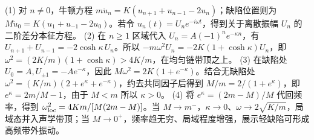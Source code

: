 (1) 对 \(n\ne0\)，牛顿方程 \(m\ddot u_n=K(u_{n+1}+u_{n-1}-2u_n)\)；缺陷位置则为 \(M\ddot u_0=K(u_1+u_{-1}-2u_0)\)。若令 \(u_n(t)=U_ne^{-i\omega t}\)，得到关于离散振幅 \(U_n\) 的二阶差分本征方程。
(2) 在 \(n\ge1\) 区域代入 \(U_n=A(-1)^n e^{-\kappa n}\)，有 \(U_{n+1}+U_{n-1}=-2\cosh\kappa\,U_n\)。所以 \(-m\omega^2U_n=-2K(1+\cosh\kappa)U_n\)，即 \(\omega^2=(2K/m)(1+\cosh\kappa)>4K/m\)，在均匀链带顶之上。
(3) 在缺陷处 \(U_0=A,U_{\pm1}=-Ae^{-\kappa}\)，因此 \(M\omega^2=2K(1+e^{-\kappa})\)。结合无缺陷处 \(\omega^2=(K/m)(2+e^\kappa+e^{-\kappa})\)，约去共同因子后得到 \(M/m=2/(1+e^\kappa)\)，即 \(e^\kappa=2m/M-1\)，由于 \(M<m\) 所以 \(\kappa>0\)。
(4) 将 \(e^\kappa=(2m-M)/M\) 代回频率，得到 \(\omega_{\rm loc}^2=4Km/[M(2m-M)]\)。当 \(M\to m^-\)，\(\kappa\to0\)、\(\omega\to2\sqrt{K/m}\)，局域态并入声学带顶；当 \(M\to0^+\)，频率趋无穷、局域程度增强，展示轻缺陷可形成高频带外振动。

